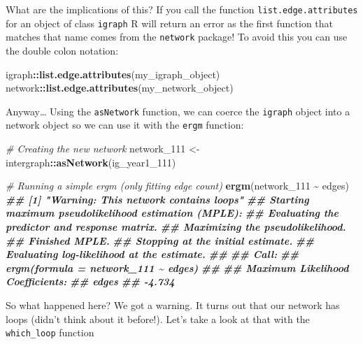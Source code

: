 \documentclass[
]{book}
\newenvironment{Shaded}{\begin{snugshade}}{\end{snugshade}}
\newcommand{\CommentTok}[1]{\textcolor[rgb]{0.56,0.35,0.01}{\textit{#1}}}
\newcommand{\DocumentationTok}[1]{\textcolor[rgb]{0.56,0.35,0.01}{\textbf{\textit{#1}}}}
\newcommand{\FunctionTok}[1]{\textcolor[rgb]{0.13,0.29,0.53}{\textbf{#1}}}
\newcommand{\NormalTok}[1]{#1}
\newcommand{\OtherTok}[1]{\textcolor[rgb]{0.56,0.35,0.01}{#1}}
\newcommand{\SpecialCharTok}[1]{\textcolor[rgb]{0.81,0.36,0.00}{\textbf{#1}}}
\begin{document}
What are the implications of this? If you call the function \texttt{list.edge.attributes} for an object of class \texttt{igraph} R will return an error as the first function that matches that name comes from the \texttt{network} package! To avoid this you can use the double colon notation:

\begin{Shaded}
\begin{Highlighting}[]
\NormalTok{igraph}\SpecialCharTok{::}\FunctionTok{list.edge.attributes}\NormalTok{(my\_igraph\_object)}
\NormalTok{network}\SpecialCharTok{::}\FunctionTok{list.edge.attributes}\NormalTok{(my\_network\_object)}
\end{Highlighting}
\end{Shaded}

Anyway\ldots{} Using the \texttt{asNetwork} function, we can coerce the \texttt{igraph} object into a network object so we can use it with the \texttt{ergm} function:

\begin{Shaded}
\begin{Highlighting}[]
\CommentTok{\# Creating the new network}
\NormalTok{network\_111 }\OtherTok{\textless{}{-}}\NormalTok{ intergraph}\SpecialCharTok{::}\FunctionTok{asNetwork}\NormalTok{(ig\_year1\_111)}

\CommentTok{\# Running a simple ergm (only fitting edge count)}
\FunctionTok{ergm}\NormalTok{(network\_111 }\SpecialCharTok{\textasciitilde{}}\NormalTok{ edges)}
\DocumentationTok{\#\# [1] "Warning:  This network contains loops"}
\DocumentationTok{\#\# Starting maximum pseudolikelihood estimation (MPLE):}
\DocumentationTok{\#\# Evaluating the predictor and response matrix.}
\DocumentationTok{\#\# Maximizing the pseudolikelihood.}
\DocumentationTok{\#\# Finished MPLE.}
\DocumentationTok{\#\# Stopping at the initial estimate.}
\DocumentationTok{\#\# Evaluating log{-}likelihood at the estimate.}
\DocumentationTok{\#\# }
\DocumentationTok{\#\# Call:}
\DocumentationTok{\#\# ergm(formula = network\_111 \textasciitilde{} edges)}
\DocumentationTok{\#\# }
\DocumentationTok{\#\# Maximum Likelihood Coefficients:}
\DocumentationTok{\#\#  edges  }
\DocumentationTok{\#\# {-}4.734}
\end{Highlighting}
\end{Shaded}

So what happened here? We got a warning. It turns out that our network has loops (didn't think about it before!). Let's take a look at that with the \texttt{which\_loop} function
\end{document}
